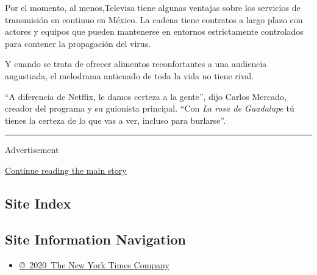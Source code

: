 Por el momento, al menos,Televisa tiene algunas ventajas sobre los
servicios de transmisión en continuo en México. La cadena tiene
contratos a largo plazo con actores y equipos que pueden mantenerse en
entornos estrictamente controlados para contener la propagación del
virus.

Y cuando se trata de ofrecer alimentos reconfortantes a una audiencia
angustiada, el melodrama anticuado de toda la vida no tiene rival.

``A diferencia de Netflix, le damos certeza a la gente'', dijo Carlos
Mercado, creador del programa y su guionista principal. ``Con \emph{La
rosa de Guadalupe} tú tienes la certeza de lo que vas a ver, incluso
para burlarse''.

\begin{center}\rule{0.5\linewidth}{\linethickness}\end{center}

Advertisement

\protect\hyperlink{after-bottom}{Continue reading the main story}

\hypertarget{site-index}{%
\subsection{Site Index}\label{site-index}}

\hypertarget{site-information-navigation}{%
\subsection{Site Information
Navigation}\label{site-information-navigation}}

\begin{itemize}
\tightlist
\item
  \href{https://help.nytimes3xbfgragh.onion/hc/en-us/articles/115014792127-Copyright-notice}{©~2020~The
  New York Times Company}
\end{itemize}

